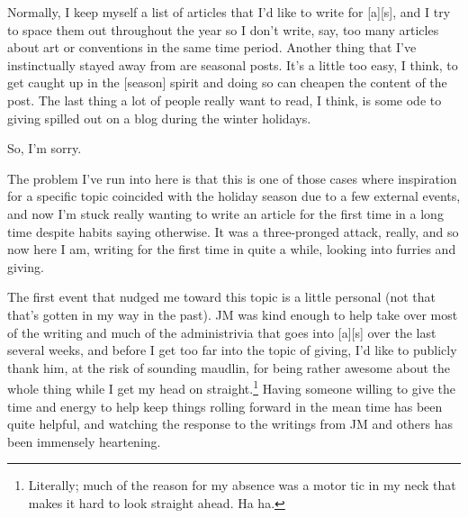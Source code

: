 
Normally, I keep myself a list of articles that I'd like to write for [a][s], and I try to space them out throughout the year so I don't write, say, too many articles about art or conventions in the same time period. Another thing that I've instinctually stayed away from are seasonal posts.  It's a little too easy, I think, to get caught up in the [season] spirit and doing so can cheapen the content of the post.  The last thing a lot of people really want to read, I think, is some ode to giving spilled out on a blog during the winter holidays.

So, I'm sorry.

The problem I've run into here is that this is one of those cases where inspiration for a specific topic coincided with the holiday season due to a few external events, and now I'm stuck really wanting to write an article for the first time in a long time despite habits saying otherwise.  It was a three-pronged attack, really, and so now here I am, writing for the first time in quite a while, looking into furries and giving.

The first event that nudged me toward this topic is a little personal (not that that's gotten in my way in the past).  JM was kind enough to help take over most of the writing and much of the administrivia that goes into [a][s] over the last several weeks, and before I get too far into the topic of giving, I'd like to publicly thank him, at the risk of sounding maudlin, for being rather awesome about the whole thing while I get my head on straight.\footnote{Literally; much of the reason for my absence was a motor tic in my neck that makes it hard to look straight ahead. Ha ha.} Having someone willing to give the time and energy to help keep things rolling forward in the mean time has been quite helpful, and watching the response to the writings from JM and others has been immensely heartening.

